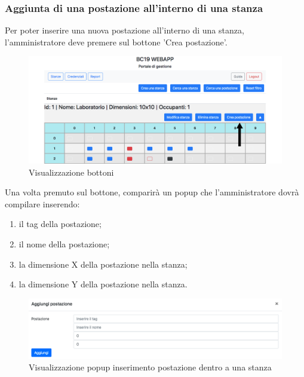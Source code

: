 \subsubsection{Aggiunta di una postazione all'interno di una stanza}
Per poter inserire una nuova postazione all'interno di una stanza, l'amministratore deve premere sul bottone 'Crea postazione'.
\begin{figure}[H]
	\centering
	\includegraphics[width=15cm]{res/images/bottoneAddWorkstation.png}
	\caption{Visualizzazione bottoni}
\end{figure}
Una volta premuto sul bottone, comparirà un popup che l'amministratore dovrà compilare inserendo:
\begin{enumerate}
	\item il tag della postazione;
	\item il nome della postazione;
	\item la dimensione X della postazione nella stanza;
	\item la dimensione Y della postazione nella stanza.
\end{enumerate}
\begin{figure}[H]
	\centering
	\includegraphics[width=15cm]{res/images/addWorkstation.png}
	\caption{Visualizzazione popup inserimento postazione dentro a una stanza}
\end{figure}

